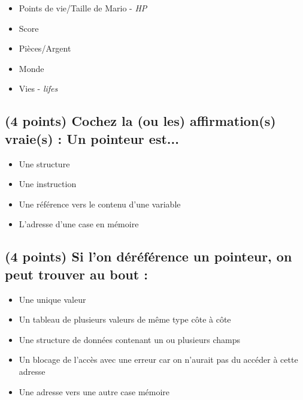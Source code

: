 \documentclass[11pt,a4paper]{article}
\begin{document}
\begin{itemize}
  \item[\CaseCoche] Points de vie/Taille de Mario - \textit{HP} \\
  \item[\checkmark] Score \\
  \item[\checkmark] Pièces/Argent \\
  \item[\checkmark] Monde \\
  \item[\CaseCoche] Vies - \textit{lifes} \\
\end{itemize}


\bigskip
\vspace*{1cm}


\subsection{(4 points) Cochez la (ou les) affirmation(s) vraie(s) : \og Un pointeur est... \fg }

\begin{itemize}
  \item[\CaseCoche] Une structure \\
  \item[\CaseCoche] Une instruction \\
  \item[\checkmark] Une référence vers le contenu d'une variable \\
  \item[\checkmark] L'adresse d'une case en mémoire \\
\end{itemize}


\vfillLast

\newpage

\vfillFirst


\subsection{(4 points) Si l'on déréférence un pointeur, on peut trouver au bout : }

\begin{itemize}
  \item[\checkmark] Une unique valeur \\
  \item[\checkmark] Un tableau de plusieurs valeurs de même type côte à côte \\
  \item[\checkmark] Une structure de données contenant un ou plusieurs champs \\
  \item[\checkmark] Un blocage de l'accès avec une erreur car on n'aurait pas du accéder à cette adresse \\
  \item[\checkmark] Une adresse vers une autre case mémoire \\
\end{itemize}
\end{document}
